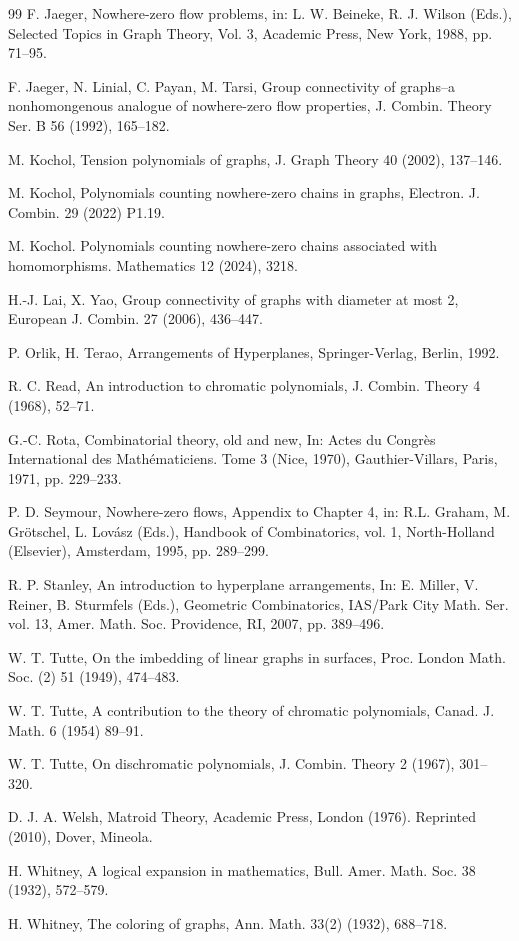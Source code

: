 \documentclass[12pt]{article}%
\numberwithin{equation}{section}
\begin{document}
\begin{thebibliography}{99}
F. Jaeger, Nowhere-zero flow problems, in: L. W. Beineke, R. J. Wilson (Eds.), Selected Topics in Graph Theory, Vol. 3, Academic Press, New York, 1988, pp. 71--95.

F. Jaeger, N. Linial, C. Payan, M. Tarsi, Group connectivity of graphs--a nonhomongenous analogue of nowhere-zero flow properties,  J. Combin. Theory Ser. B 56 (1992), 165--182.

M. Kochol, Tension polynomials of graphs, J. Graph Theory 40 (2002), 137--146.

M. Kochol, Polynomials counting nowhere-zero chains in graphs, Electron. J. Combin. 29 (2022) P1.19.

M. Kochol. Polynomials counting nowhere-zero chains associated with homomorphisms. Mathematics 12 (2024), 3218.

H.-J. Lai, X. Yao, Group connectivity of graphs with diameter at most 2, European J. Combin. 27 (2006), 436--447.

P. Orlik, H. Terao, Arrangements of Hyperplanes, Springer-Verlag, Berlin, 1992.

R. C. Read, An introduction to chromatic polynomials, J. Combin. Theory 4 (1968), 52--71.

G.-C. Rota, Combinatorial theory, old and new, In: Actes du Congr\`{e}s International des Math\'{e}maticiens. Tome 3 (Nice, 1970), Gauthier-Villars, Paris, 1971, pp. 229--233.

P. D. Seymour, Nowhere-zero flows, Appendix to Chapter 4, in: R.L. Graham, M. Grötschel, L. Lovász (Eds.), Handbook of Combinatorics, vol. 1, North-Holland (Elsevier), Amsterdam, 1995, pp. 289--299.

R. P. Stanley, An introduction to hyperplane arrangements, In: E. Miller, V. Reiner, B. Sturmfels (Eds.), Geometric Combinatorics, IAS/Park City Math. Ser. vol. 13, Amer. Math. Soc. Providence, RI, 2007, pp. 389--496.

W. T. Tutte, On the imbedding of linear graphs in surfaces, Proc. London Math. Soc. (2) 51 (1949), 474--483.
 
W. T. Tutte, A contribution to the theory of chromatic polynomials, Canad. J. Math. 6 (1954) 89--91.

W. T. Tutte, On dischromatic polynomials, J. Combin. Theory 2 (1967), 301--320.

D. J. A. Welsh, Matroid Theory, Academic Press, London (1976). Reprinted (2010), Dover, Mineola.

H. Whitney, A logical expansion in mathematics, Bull. Amer. Math. Soc. 38 (1932), 572--579.

H. Whitney, The coloring of graphs, Ann. Math. 33(2) (1932), 688--718.
\end{thebibliography}
\end{document}
